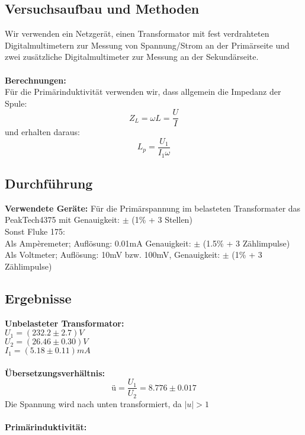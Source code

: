 \documentclass{article}
\begin{document}
\subsection{Versuchsaufbau und Methoden}
Wir verwenden ein Netzgerät, einen Transformator mit fest verdrahteten Digitalmultimetern zur Messung von Spannung/Strom an der Primärseite und zwei zusätzliche Digitalmultimeter zur Messung an der Sekundärseite.\\
\\
\textbf{Berechnungen:}\\
Für die Primärinduktivität verwenden wir, dass allgemein die Impedanz der Spule:
$$Z_L=\omega L = \frac{U}{I}$$
und erhalten daraus:
\begin{equation}
\label{Induktivitaet}
L_p=\frac{U_1}{I_1 \omega}
\end{equation}


\subsection{Durchführung}
\textbf{Verwendete Geräte:}
Für die Primärspannung im belasteten Transformater das PeakTech4375 mit Genauigkeit: $\pm$ (1\% + 3 Stellen)\\
Sonst Fluke 175:\\
Als Ampèremeter; Auflösung: 0.01mA Genauigkeit: $\pm$ (1.5\% + 3 Zählimpulse)\\
Als Voltmeter; Auflösung: 10mV bzw. 100mV, Genauigkeit: $\pm$ (1\% + 3 Zählimpulse)\\

\subsection{Ergebnisse}
\textbf{Unbelasteter Transformator:}\\
$U_1=(232.2 \pm 2.7)V$\\
$U_2=(26.46 \pm 0.30)V$\\
$I_1=(5.18 \pm 0.11)mA$\\
\\
\textbf{Übersetzungsverhältnis:}\\
$$\textrm{ü}=\frac{U_1}{U_2}=8.776 \pm 0.017$$
Die Spannung wird nach unten transformiert, da $|u|>1$ \\
\\
\textbf{Primärinduktivität:}\\
\end{document}
